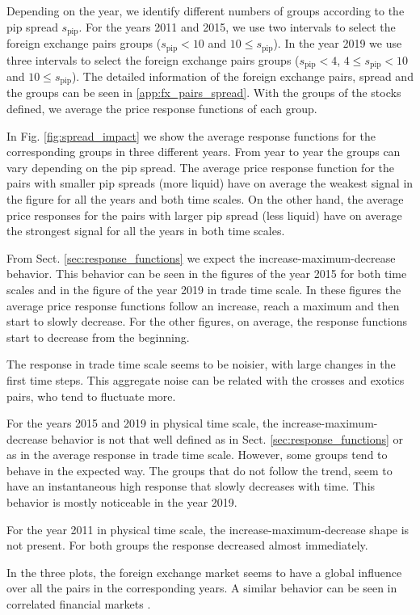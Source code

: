 Depending on the year, we identify different numbers of groups according to the pip spread $s_{\textrm{pip}}$. For the years 2011 and 2015, we use two
intervals to select the foreign exchange pairs groups ($s_{\textrm{pip}}<10$
and $10 \le s_{\textrm{pip}}$). In the year 2019 we use three intervals to
select the foreign exchange pairs groups ($s_{\textrm{pip}}<4$,
$4 \le s_{\textrm{pip}} < 10$ and $10 \le s_{\textrm{pip}}$). The detailed
information of the foreign exchange pairs, spread and the groups can be seen in
\ref{app:fx_pairs_spread}. With the groups of the stocks defined, we
average the price response functions of each group.

In Fig. \ref{fig:spread_impact} we show the average response functions for
the corresponding groups in three different years. From year to year the groups
can vary depending on the pip spread. The average price response function for
the pairs with smaller pip spreads (more liquid) have on average the weakest
signal in the figure for all the years and both time scales. On the other hand,
the average price responses for the pairs with larger pip spread (less liquid)
have on average the strongest signal for all the years in both time scales.

From Sect. \ref{sec:response_functions} we expect the increase-maximum-decrease
behavior. This behavior can be seen in the figures of the year 2015 for both
time scales and in the figure of the year 2019 in trade time scale. In these
figures the average price response functions follow an increase, reach a
maximum and then start to slowly decrease. For the other figures, on average,
the response functions start to decrease from the beginning.

The response in trade time scale seems to be noisier, with large changes in the
first time steps. This aggregate noise can be related with the crosses and
exotics pairs, who tend to fluctuate more.

For the years 2015 and 2019 in physical time scale, the
increase-maximum-decrease behavior is not that well defined as in Sect.
\ref{sec:response_functions} or as in the average response in trade time scale.
However, some groups tend to behave in the expected way. The groups that do not
follow the trend, seem to have an instantaneous high response that slowly
decreases with time. This behavior is mostly noticeable in the year 2019.

For the year 2011 in physical time scale, the increase-maximum-decrease shape
is not present. For both groups the response decreased almost immediately.

In the three plots, the foreign exchange market seems to have a global
influence over all the pairs in the corresponding years. A similar behavior
can be seen in correlated financial markets
\cite{my_paper_response_financial}.